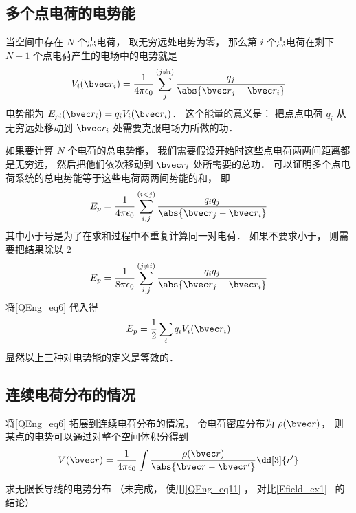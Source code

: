 \subsection{多个点电荷的电势能}
 当空间中存在 $N$ 个点电荷， 取无穷远处电势为零， 那么第 $i$ 个点电荷在剩下 $N-1$ 个点电荷产生的电场中的电势就是
\begin{equation}\label{QEng_eq6}
V_i(\bvec r_i) = \frac{1}{4\pi\epsilon_0} \sum_j^{(j\ne i)} \frac{q_j}{\abs{\bvec r_j - \bvec r_i}}
\end{equation}
电势能为 $E_{pi}(\bvec r_i) = q_i V_i(\bvec r_i)$． 这个能量的意义是： 把点点电荷 $q_i$ 从无穷远处移动到 $\bvec r_i$ 处需要克服电场力所做的功．

如果要计算 $N$ 个电荷的总电势能， 我们需要假设开始时这些点电荷两两间距离都是无穷远， 然后把他们依次移动到 $\bvec r_i$ 处所需要的总功． 可以证明多个点电荷系统的总电势能等于这些电荷两两间势能的和， 即
\begin{equation}\label{QEng_eq10}
E_p = \frac{1}{4\pi\epsilon_0} \sum_{i,j}^{(i < j)} \frac{q_i q_j}{\abs{\bvec r_j - \bvec r_i}}
\end{equation}
其中小于号是为了在求和过程中不重复计算同一对电荷． 如果不要求小于， 则需要把结果除以 2
\begin{equation}
E_p = \frac{1}{8\pi\epsilon_0} \sum_{i, j}^{(j\neq i)} \frac{q_i q_j}{\abs{\bvec r_j - \bvec r_i}}
\end{equation}
将\autoref{QEng_eq6} 代入得
\begin{equation}\label{QEng_eq7}
E_p = \frac12 \sum_i q_i V_i(\bvec r_i)
\end{equation}
显然以上三种对电势能的定义是等效的．

\subsection{连续电荷分布的情况}
将\autoref{QEng_eq6} 拓展到连续电荷分布的情况， 令电荷密度分布为 $\rho(\bvec r)$， 则某点的电势可以通过对整个空间体积分得到
\begin{equation}\label{QEng_eq11}
V(\bvec r) = \frac{1}{4\pi\epsilon_0} \int \frac{\rho(\bvec r)}{\abs{\bvec r - \bvec r'}} \dd[3]{r'}
\end{equation}

\begin{example}{求无限长导线的电势分布}
（未完成， 使用\autoref{QEng_eq11} ， 对比\autoref{Efield_ex1}~ 的结论）

\end{example}

